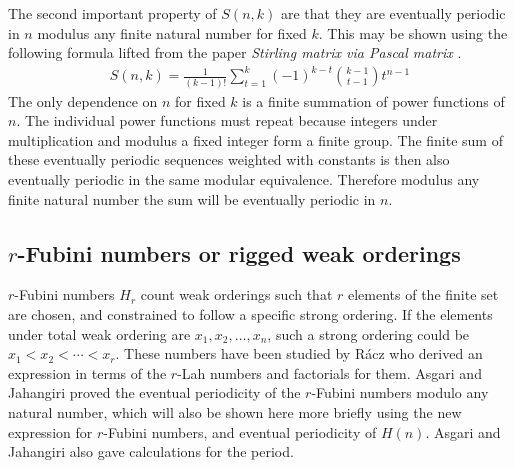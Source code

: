 \documentclass[12pt,reqno]{article}
\begin{document}
The second important property of $S(n,k)$ are that they are eventually periodic in $n$ modulus any finite natural number  for fixed $k$. This may be shown using the following formula lifted from the paper \textit{Stirling matrix via Pascal matrix} \cite{cc:relation}.
\begin{align}
	S(n,k) = \frac{1}{(k - 1)!} \sum_{t = 1}^{k}(-1)^{k-t}\binom{k-1}{t-1} t^{n-1}
\end{align}
The only dependence on $n$ for fixed $k$ is a finite summation of power functions of $n$. The individual power functions must repeat because integers under multiplication and modulus a fixed integer form a finite group. The finite sum of these eventually periodic sequences weighted with constants is then also eventually periodic in the same modular equivalence. Therefore modulus any finite natural number the sum will be eventually periodic in $n$.

\subsection{$r$-Fubini numbers or rigged weak orderings}


$r$-Fubini numbers $H_{r}$ count weak orderings such that $r$ elements of the finite set are chosen, and constrained to follow a specific strong ordering. If the elements under total weak ordering are $x_{1}, x_{2}, \ldots, x_{n}$, such a strong ordering could be $x_{1} < x_{2} < \cdots < x_{r}$. These numbers have been studied by R\'acz who derived an expression in terms of the $r$-Lah numbers and factorials \cite{cc:racz} for them. Asgari and Jahangiri \cite{cc:asgari} proved the eventual periodicity of the $r$-Fubini numbers modulo any natural number, which will also be shown here more briefly using the new expression for $r$-Fubini numbers, and eventual periodicity of $H(n)$. Asgari and Jahangiri also gave calculations for the period.
\end{document}
